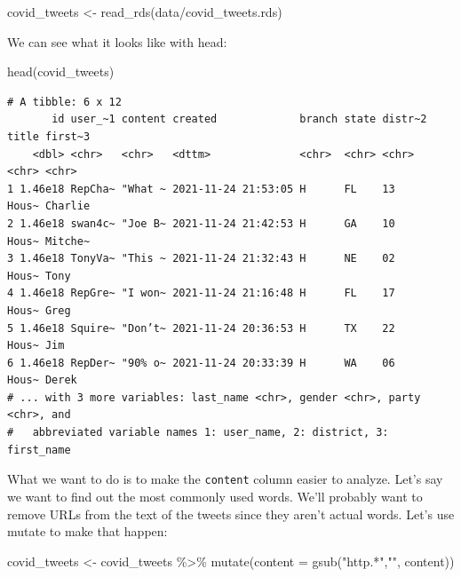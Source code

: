 \documentclass[
  letterpaper,
  DIV=11,
  numbers=noendperiod]{scrreprt}
\newenvironment{Shaded}{\begin{snugshade}}{\end{snugshade}}
\newcommand{\AttributeTok}[1]{\textcolor[rgb]{0.40,0.45,0.13}{#1}}
\newcommand{\FunctionTok}[1]{\textcolor[rgb]{0.28,0.35,0.67}{#1}}
\newcommand{\NormalTok}[1]{\textcolor[rgb]{0.00,0.23,0.31}{#1}}
\newcommand{\OtherTok}[1]{\textcolor[rgb]{0.00,0.23,0.31}{#1}}
\newcommand{\SpecialCharTok}[1]{\textcolor[rgb]{0.37,0.37,0.37}{#1}}
\newcommand{\StringTok}[1]{\textcolor[rgb]{0.13,0.47,0.30}{#1}}
\begin{document}
\begin{Shaded}
\begin{Highlighting}[]
\NormalTok{covid\_tweets }\OtherTok{\textless{}{-}} \FunctionTok{read\_rds}\NormalTok{(}\StringTok{\textquotesingle{}data/covid\_tweets.rds\textquotesingle{}}\NormalTok{)}
\end{Highlighting}
\end{Shaded}

We can see what it looks like with head:

\begin{Shaded}
\begin{Highlighting}[]
\FunctionTok{head}\NormalTok{(covid\_tweets)}
\end{Highlighting}
\end{Shaded}

\begin{verbatim}
# A tibble: 6 x 12
       id user_~1 content created             branch state distr~2 title first~3
    <dbl> <chr>   <chr>   <dttm>              <chr>  <chr> <chr>   <chr> <chr>  
1 1.46e18 RepCha~ "What ~ 2021-11-24 21:53:05 H      FL    13      Hous~ Charlie
2 1.46e18 swan4c~ "Joe B~ 2021-11-24 21:42:53 H      GA    10      Hous~ Mitche~
3 1.46e18 TonyVa~ "This ~ 2021-11-24 21:32:43 H      NE    02      Hous~ Tony   
4 1.46e18 RepGre~ "I won~ 2021-11-24 21:16:48 H      FL    17      Hous~ Greg   
5 1.46e18 Squire~ "Don’t~ 2021-11-24 20:36:53 H      TX    22      Hous~ Jim    
6 1.46e18 RepDer~ "90% o~ 2021-11-24 20:33:39 H      WA    06      Hous~ Derek  
# ... with 3 more variables: last_name <chr>, gender <chr>, party <chr>, and
#   abbreviated variable names 1: user_name, 2: district, 3: first_name
\end{verbatim}

What we want to do is to make the \texttt{content} column easier to
analyze. Let's say we want to find out the most commonly used words.
We'll probably want to remove URLs from the text of the tweets since
they aren't actual words. Let's use mutate to make that happen:

\begin{Shaded}
\begin{Highlighting}[]
\NormalTok{covid\_tweets }\OtherTok{\textless{}{-}}\NormalTok{ covid\_tweets }\SpecialCharTok{\%\textgreater{}\%}
  \FunctionTok{mutate}\NormalTok{(}\AttributeTok{content =} \FunctionTok{gsub}\NormalTok{(}\StringTok{"http.*"}\NormalTok{,}\StringTok{""}\NormalTok{, content))}
\end{Highlighting}
\end{Shaded}
\end{document}
